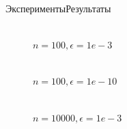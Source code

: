 \documentclass{beamer}
\begin{document}
\begin{frame}{Эксперименты}{Результаты}
\begin{figure}[H]
\begin{minipage}[h]{0.47\linewidth}
 \\$n=100, \epsilon=1e-3$ \\
\end{minipage}
\hfill
\begin{minipage}[h]{0.47\linewidth}
 \\$n=100, \epsilon=1e-10$
\end{minipage}
\vfill
\begin{minipage}[h]{0.47\linewidth}
 \\$n=10000, \epsilon=1e-3$ \\

\end{minipage}
\end{figure}
\end{frame}
\end{document}
